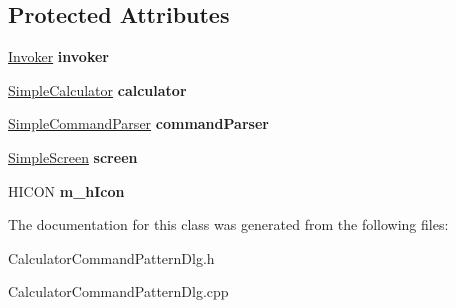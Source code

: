 \subsection*{Protected Attributes}
\begin{DoxyCompactItemize}
\item 
\hypertarget{class_c_calculator_command_pattern_dlg_a29dba11d477544ed323dd470d4d885c7}{}\hyperlink{class_invoker}{Invoker} {\bfseries invoker}\label{class_c_calculator_command_pattern_dlg_a29dba11d477544ed323dd470d4d885c7}

\item 
\hypertarget{class_c_calculator_command_pattern_dlg_a4f6f3339b71735d69e73dc4b826ba8c2}{}\hyperlink{class_simple_calculator}{Simple\+Calculator} {\bfseries calculator}\label{class_c_calculator_command_pattern_dlg_a4f6f3339b71735d69e73dc4b826ba8c2}

\item 
\hypertarget{class_c_calculator_command_pattern_dlg_af9d7533c4b711ba40d0f476b4fd61053}{}\hyperlink{class_simple_command_parser}{Simple\+Command\+Parser} {\bfseries command\+Parser}\label{class_c_calculator_command_pattern_dlg_af9d7533c4b711ba40d0f476b4fd61053}

\item 
\hypertarget{class_c_calculator_command_pattern_dlg_a6dad3f0247c1932d9ab1f16e1a509c21}{}\hyperlink{class_simple_screen}{Simple\+Screen} {\bfseries screen}\label{class_c_calculator_command_pattern_dlg_a6dad3f0247c1932d9ab1f16e1a509c21}

\item 
\hypertarget{class_c_calculator_command_pattern_dlg_a6b85b292776bfffc55649ed7029b4abb}{}H\+I\+C\+O\+N {\bfseries m\+\_\+h\+Icon}\label{class_c_calculator_command_pattern_dlg_a6b85b292776bfffc55649ed7029b4abb}

\end{DoxyCompactItemize}


The documentation for this class was generated from the following files\+:\begin{DoxyCompactItemize}
\item 
Calculator\+Command\+Pattern\+Dlg.\+h\item 
Calculator\+Command\+Pattern\+Dlg.\+cpp\end{DoxyCompactItemize}
